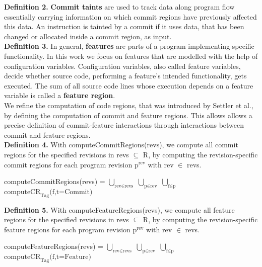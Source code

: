 \textbf{Definition 2.} \textbf{Commit taints} are used to track data along program flow essentially carrying information on which commit regions have previously affected this data.
An instruction is tainted by a commit if it uses data, that has been changed or allocated inside a commit region, as input. \\

\textbf{Definition 3.} In general, \textbf{features} are parts of a program implementing specific functionality.
In this work we focus on features that are modelled with the help of configuration variables.
Configuration variables, also called feature variables, decide whether source code, performing a feature's intended functionality, gets executed.
The sum of all source code lines whose execution depends on a feature variable is called a \textbf{feature region}. \\

We refine the computation of code regions, that was introduced by Settler et al., by defining the computation of commit and feature regions.
This allows allows a precise definition of commit-feature interactions through interactions between commit and feature regions. \\

\textbf{Definition 4.} With computeCommitRegions(revs), we compute all commit regions for the specified revisions in revs $\subseteq$ R, 
by computing the revision-specific commit regions for each program revision $\text{p}^{\text{rev}}$ with rev $\in$ revs.
\begin{center} computeCommitRegions(revs) = $\bigcup\limits_{\text{rev} \in \text{revs}}$ $\bigcup\limits_{\text{p} \in \text{rev}}$ $\bigcup\limits_{\text{f} \in \text{p}}$ 
	$\text{computeCR}_{\text{Tag}}\text{(f,t=Commit)}$ 
\end{center}

\textbf{Definition 5.} With computeFeatureRegions(revs), we compute all feature regions for the specified revisions in revs $\subseteq$ R, 
by computing the revision-specific feature regions for each program revision $\text{p}^{\text{rev}}$ with rev $\in$ revs.
\begin{center} computeFeatureRegions(revs) = $\bigcup\limits_{\text{rev} \in \text{revs}}$ $\bigcup\limits_{\text{p} \in \text{rev}}$ $\bigcup\limits_{\text{f} \in \text{p}}$ 
	$\text{computeCR}_{\text{Tag}}\text{(f,t=Feature)}$ 
\end{center}

